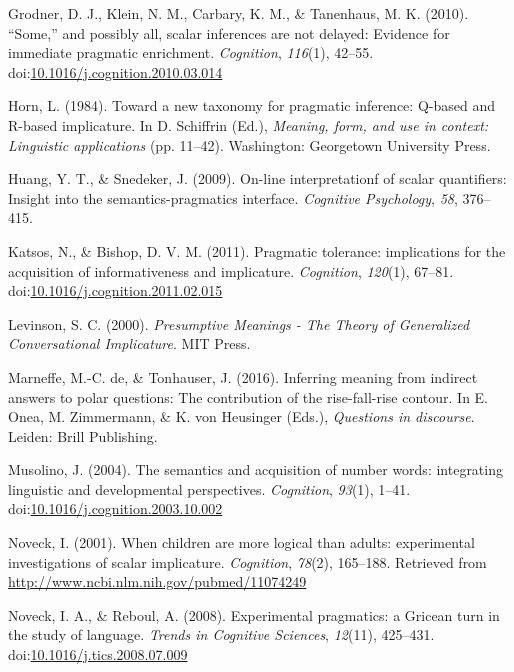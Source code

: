 \documentclass[floatsintext,man]{apa6}
\theoremstyle{definition}
\theoremstyle{definition}
\theoremstyle{definition}
\theoremstyle{remark}
\begin{document}
\hypertarget{ref-Grodner2010}{}
Grodner, D. J., Klein, N. M., Carbary, K. M., \& Tanenhaus, M. K.
(2010). ``Some,'' and possibly all, scalar inferences are not delayed:
Evidence for immediate pragmatic enrichment. \emph{Cognition},
\emph{116}(1), 42--55.
doi:\href{https://doi.org/10.1016/j.cognition.2010.03.014}{10.1016/j.cognition.2010.03.014}

\hypertarget{ref-horn1984}{}
Horn, L. (1984). Toward a new taxonomy for pragmatic inference: Q-based
and R-based implicature. In D. Schiffrin (Ed.), \emph{Meaning, form, and
use in context: Linguistic applications} (pp. 11--42). Washington:
Georgetown University Press.

\hypertarget{ref-huang2009}{}
Huang, Y. T., \& Snedeker, J. (2009). On-line interpretationf of scalar
quantifiers: Insight into the semantics-pragmatics interface.
\emph{Cognitive Psychology}, \emph{58}, 376--415.

\hypertarget{ref-Katsos2011}{}
Katsos, N., \& Bishop, D. V. M. (2011). Pragmatic tolerance:
implications for the acquisition of informativeness and implicature.
\emph{Cognition}, \emph{120}(1), 67--81.
doi:\href{https://doi.org/10.1016/j.cognition.2011.02.015}{10.1016/j.cognition.2011.02.015}

\hypertarget{ref-levinson2000}{}
Levinson, S. C. (2000). \emph{Presumptive Meanings - The Theory of
Generalized Conversational Implicature}. MIT Press.

\hypertarget{ref-DeMarneffe2017}{}
Marneffe, M.-C. de, \& Tonhauser, J. (2016). Inferring meaning from
indirect answers to polar questions: The contribution of the
rise-fall-rise contour. In E. Onea, M. Zimmermann, \& K. von Heusinger
(Eds.), \emph{Questions in discourse}. Leiden: Brill Publishing.

\hypertarget{ref-Musolino2004}{}
Musolino, J. (2004). The semantics and acquisition of number words:
integrating linguistic and developmental perspectives. \emph{Cognition},
\emph{93}(1), 1--41.
doi:\href{https://doi.org/10.1016/j.cognition.2003.10.002}{10.1016/j.cognition.2003.10.002}

\hypertarget{ref-Noveck2001}{}
Noveck, I. (2001). When children are more logical than adults:
experimental investigations of scalar implicature. \emph{Cognition},
\emph{78}(2), 165--188. Retrieved from
\url{http://www.ncbi.nlm.nih.gov/pubmed/11074249}

\hypertarget{ref-noveck2008}{}
Noveck, I. A., \& Reboul, A. (2008). Experimental pragmatics: a Gricean
turn in the study of language. \emph{Trends in Cognitive Sciences},
\emph{12}(11), 425--431.
doi:\href{https://doi.org/10.1016/j.tics.2008.07.009}{10.1016/j.tics.2008.07.009}
\end{document}
